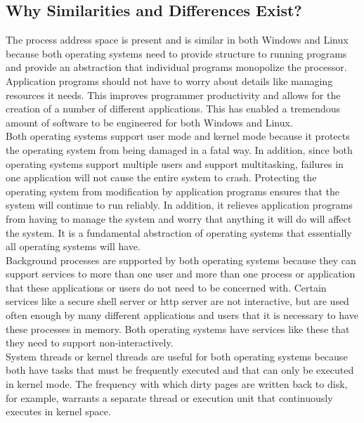 \documentclass[letterpaper,10pt,titlepage]{article}
\begin{document}
\subsection{Why Similarities and Differences Exist?}
The process address space is present and is similar in both Windows and Linux
because both operating systems need to provide structure to running programs
and provide an abstraction that individual programs monopolize the processor.
Application programs should not have to worry about details like managing 
resources it needs. This improves programmer productivity and allows for the
creation of a number of different applications. This has enabled a tremendous 
amount of software to be engineered for both Windows and Linux. 
\\
\linebreak
Both operating systems support user mode and kernel mode because it protects
the operating system from being damaged in a fatal way. In addition, since 
both operating systems support multiple users and support multitasking, 
failures in one application will not cause the entire system to crash. 
Protecting the operating system from modification by application programs 
ensures that the system will continue to run reliably. In addition, it 
relieves application programs from having to manage the system and worry that
anything it will do will affect the system. It is a fundamental abstraction of 
operating systems that essentially all operating systems will have.
\\
\linebreak
Background processes are supported by both operating systems because they can
support services to more than one user and more than one process or 
application that these applications or users do not need to be concerned with.
Certain services like a secure shell server or http server are not 
interactive, but are used often enough by many different applications and 
users that it is necessary to have these processes in memory. Both operating
systems have services like these that they need to support non-interactively.
\\
\linebreak
System threads or kernel threads are useful for both operating systems 
because both have tasks that must be frequently executed and that can only be
executed in kernel mode. The frequency with which dirty pages are written 
back to disk, for example,  warrants a separate thread or execution unit that
continuously executes in kernel space. 
\\
\end{document}
